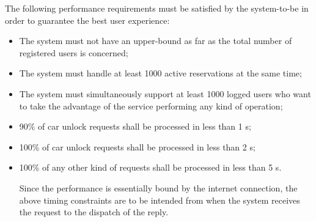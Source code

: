 The following performance requirements must be satisfied by the system-to-be in order to guarantee the best user experience:
\begin{itemize}
\item The system must not have an upper-bound as far as the total number of registered users is concerned;
\item The system must handle at least 1000 active reservations at the same time;
\item The system must simultaneously support at least 1000 logged users who want to take the advantage of the service performing any kind of operation;
\item 90\% of car unlock requests shall be processed in less than 1 s;
\item 100\% of car unlock requests shall be processed in less than 2 s;
\item 100\% of any other kind of requests shall be processed in less than 5 s.

Since the performance is essentially bound by the internet connection, the above timing constraints are to be intended from when the system receives the request to the dispatch of the reply.
\end{itemize}